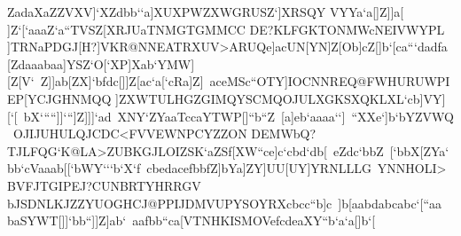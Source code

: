 {{{ ZadaXaZZVXV]`XZdbb``a]XUXPWZXWGRUSZ`]XRSQY%
 VYYa`a[]Z]]a[%
 ]Z`[`aaaZ`a``TVSZ[XRJUaTNMGTGMMCC%
 DE?KLFGKTONMWcNEIVWYPL}
 \hbox{]TRNaPDGJ[H?]VKR@NNEATRXUV>ARUQe]acUN[YN]Z[Ob]cZ[]b`[ca```dadfa%
 [Zdaaabaa]YSZ`O[`XP]Xab`YMW][Z[V`%
 Z]]ab[ZX]`bfdc[]]Z[ac`a[`cRa]Z]%
 aceMSc``OTY]IOCNNREQ@FWHURUWPIEP[YCJGHNMQQ}
 \hbox{]ZXWTULHGZGIMQYSCMQOJULXGKSXQKLXL`cb]VY][`[%
 bX`````]]```]Z]]]`ad%
 XNY`ZYaaTccaYTWP[]``b``Z%
 [a]eb`aaaa``]%
 ``XXe`]b`bYZVWQ%
 OJIJUHULQJCDC<FVVEWNPCYZZON}
 \hbox{DEMWbQ?TJLFQG`K@LA>ZUBKGJLOIZSK`aZSf[XW``ce]c`cbd`db[%
 eZdc`bbZ%
 [`bbX[ZYa`bb`cVaaab[[`bWY```b`X`f%
 cbedacefbbfZ]bYa]ZY]UU[UY]YRNLLLG%
 YNNHOLI>BVFJTGIPEJ?CUNBRTYHRRGV}
 \hbox{bJSDNLKJZZYUOGHCJ@PPIJDMVUPYSOYRXcbcc``b]c%
 ]b[aabdabcabc`[``aa%
 baSYWT[]]`bb``]]Z]ab`%
 aafbb``ca[VTNHKISMOVefcdeaXY``b`a`a[]b`[%
}}}
